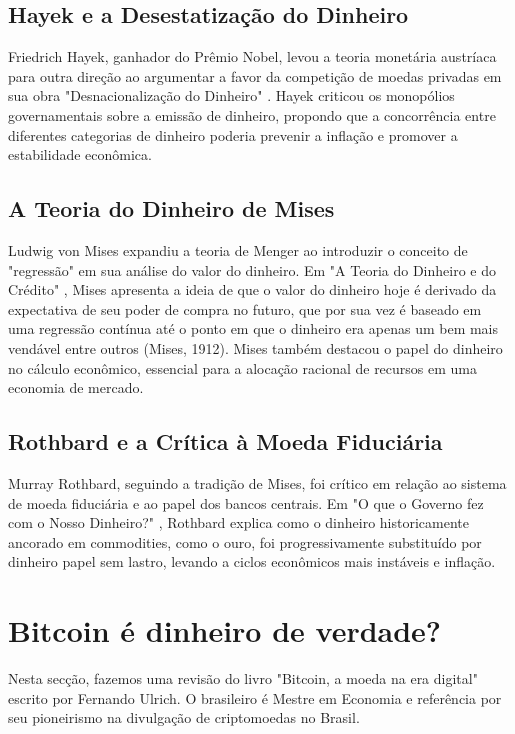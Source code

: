 \subsection{Hayek e a Desestatização do Dinheiro}
Friedrich Hayek, ganhador do Prêmio Nobel, levou a teoria monetária austríaca para outra direção ao argumentar a favor da competição de moedas privadas em sua obra "Desnacionalização do Dinheiro" \cite{hayek2017desestatizaccao}. Hayek criticou os monopólios governamentais sobre a emissão de dinheiro, propondo que a concorrência entre diferentes categorias de dinheiro poderia prevenir a inflação e promover a estabilidade econômica.

\subsection{A Teoria do Dinheiro de Mises}
Ludwig von Mises expandiu a teoria de Menger ao introduzir o conceito de "regressão" em sua análise do valor do dinheiro. Em "A Teoria do Dinheiro e do Crédito" \cite{von2013theory}, Mises apresenta a ideia de que o valor do dinheiro hoje é derivado da expectativa de seu poder de compra no futuro, que por sua vez é baseado em uma regressão contínua até o ponto em que o dinheiro era apenas um bem mais vendável entre outros (Mises, 1912). Mises também destacou o papel do dinheiro no cálculo econômico, essencial para a alocação racional de recursos em uma economia de mercado.

\subsection{Rothbard e a Crítica à Moeda Fiduciária}
Murray Rothbard, seguindo a tradição de Mises, foi crítico em relação ao sistema de moeda fiduciária e ao papel dos bancos centrais. Em "O que o Governo fez com o Nosso Dinheiro?" \cite{rothbard2022governo}, Rothbard explica como o dinheiro historicamente ancorado em commodities, como o ouro, foi progressivamente substituído por dinheiro papel sem lastro, levando a ciclos econômicos mais instáveis e inflação.

\section{Bitcoin é dinheiro de verdade?} \label{sec:dinheiro}
Nesta secção, fazemos uma revisão do livro "Bitcoin, a moeda na era digital"\cite{Ulrich2014} escrito por Fernando Ulrich. O brasileiro é Mestre em Economia e referência por seu pioneirismo na divulgação de criptomoedas no Brasil. 

